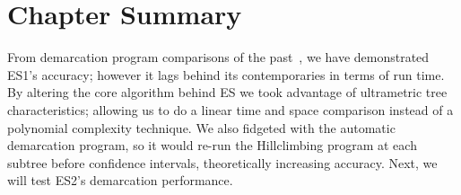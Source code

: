 %
%
%
%


\section{Chapter Summary}
From demarcation program comparisons of the past~\cite{carlo}, we have demonstrated ES1's accuracy; however it lags behind its contemporaries in terms of run time.
By altering the core algorithm behind ES we took advantage of ultrametric tree characteristics; allowing us to do a linear time and space comparison instead of a polynomial complexity technique.
We also fidgeted with the automatic demarcation program, so it would re-run the Hillclimbing program at each subtree before confidence intervals, theoretically increasing accuracy.
Next, we will test ES2's demarcation performance.


